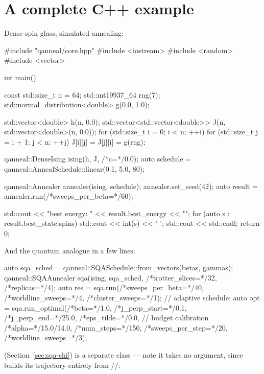 \section{A complete C++ example}

Dense spin glass, simulated annealing:

\begin{cppcode}
#include "qanneal/core.hpp"
#include <iostream>
#include <random>
#include <vector>

int main() {
    const std::size_t n = 64;
    std::mt19937_64 rng(7);
    std::normal_distribution<double> g(0.0, 1.0);

    std::vector<double> h(n, 0.0);
    std::vector<std::vector<double>> J(n, std::vector<double>(n, 0.0));
    for (std::size_t i = 0; i < n; ++i)
        for (std::size_t j = i + 1; j < n; ++j)
            J[i][j] = J[j][i] = g(rng);

    qanneal::DenseIsing ising(h, J, /*c=*/0.0);
    auto schedule = qanneal::AnnealSchedule::linear(0.1, 5.0, 80);

    qanneal::Annealer annealer(ising, schedule);
    annealer.set_seed(42);
    auto result = annealer.run(/*sweeps_per_beta=*/60);

    std::cout << "best energy: " << result.best_energy << "\n";
    for (auto s : result.best_state.spins) std::cout << int(s) << ' ';
    std::cout << std::endl;
    return 0;
}
\end{cppcode}

And the quantum analogue in a few lines:

\begin{cppcode}
auto sqa_sched = qanneal::SQASchedule::from_vectors(betas, gammas);
qanneal::SQAAnnealer sqa(ising, sqa_sched,
                         /*trotter_slices=*/32, /*replicas=*/4);
auto res = sqa.run(/*sweeps_per_beta=*/40,
                   /*worldline_sweeps=*/4,
                   /*cluster_sweeps=*/1);
// adaptive schedule:
auto opt = sqa.run_optimal(/*beta=*/1.0,
                           /*j_perp_start=*/0.1, /*j_perp_end=*/25.0,
                           /*eps_tilde=*/0.0,      // budget calibration
                           /*alpha=*/15.0/14.0,
                           /*num_steps=*/150, /*sweeps_per_step=*/20,
                           /*worldline_sweeps=*/3);
\end{cppcode}

 (Section~\ref{sec:sqa-chi}) is a separate class --- note it
takes no  argument, since  builds its
trajectory entirely from //:


